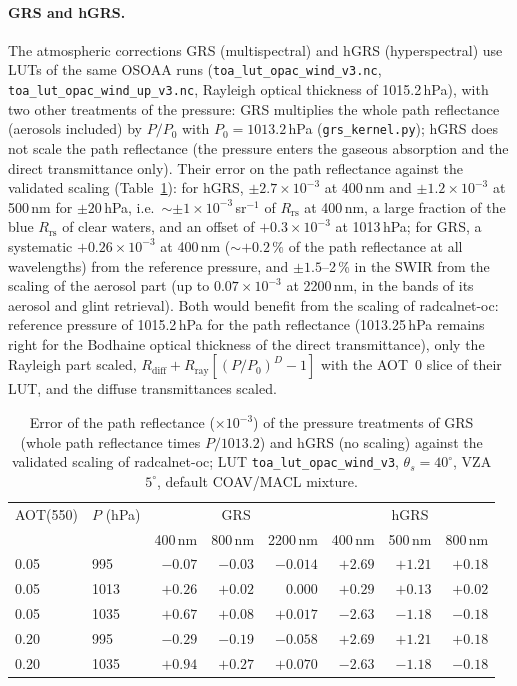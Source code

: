 \documentclass[11pt,a4paper]{article}
\newcommand{\Rrs}{R_\mathrm{rs}}
\newcommand{\code}[1]{\texttt{#1}}
\begin{document}
\paragraph{GRS and hGRS.} The atmospheric corrections GRS (multispectral) and hGRS (hyperspectral) use LUTs of the
same OSOAA runs (\code{toa\_lut\_opac\_wind\_v3.nc}, \code{toa\_lut\_opac\_wind\_up\_v3.nc}, Rayleigh optical thickness
of 1015.2\,hPa), with two other treatments of the pressure: GRS multiplies the whole path reflectance (aerosols
included) by $P/P_0$ with $P_0 = 1013.2$\,hPa (\code{grs\_kernel.py}); hGRS does not scale the path reflectance
(the pressure enters the gaseous absorption and the direct transmittance only). Their error on the path reflectance
against the validated scaling (Table~\ref{tab:grs_pressure}): for hGRS, $\pm2.7\times10^{-3}$ at 400\,nm and
$\pm1.2\times10^{-3}$ at 500\,nm for $\pm20$\,hPa, i.e.\ $\sim\pm1\times10^{-3}$\,sr$^{-1}$ of $\Rrs$ at 400\,nm, a large
fraction of the blue $\Rrs$ of clear waters, and an offset of $+0.3\times10^{-3}$ at 1013\,hPa; for GRS, a systematic
$+0.26\times10^{-3}$ at 400\,nm ($\sim+0.2\,\%$ of the path reflectance at all wavelengths) from the reference pressure,
and $\pm1.5$--2\,\% in the SWIR from the scaling of the aerosol part (up to $0.07\times10^{-3}$ at 2200\,nm, in the bands of
its aerosol and glint retrieval). Both would benefit from the scaling of radcalnet-oc: reference pressure of
1015.2\,hPa for the path reflectance (1013.25\,hPa remains right for the Bodhaine optical thickness of the direct
transmittance), only the Rayleigh part scaled, $R_\mathrm{diff} + R_\mathrm{ray}[(P/P_0)^D - 1]$ with the AOT~0 slice
of their LUT, and the diffuse transmittances scaled.

\begin{table}[h]
\centering\small
\caption{Error of the path reflectance ($\times10^{-3}$) of the pressure treatments of GRS (whole path reflectance
times $P/1013.2$) and hGRS (no scaling) against the validated scaling of radcalnet-oc; LUT \code{toa\_lut\_opac\_wind\_v3},
$\theta_s=40^\circ$, VZA $5^\circ$, default COAV/MACL mixture.}
\label{tab:grs_pressure}
\begin{tabular}{llrrrrrr}
\toprule
AOT(550) & $P$ (hPa) & \multicolumn{3}{c}{GRS} & \multicolumn{3}{c}{hGRS} \\
 & & 400\,nm & 800\,nm & 2200\,nm & 400\,nm & 500\,nm & 800\,nm \\
\midrule
0.05 & 995  & $-0.07$ & $-0.03$ & $-0.014$ & $+2.69$ & $+1.21$ & $+0.18$ \\
0.05 & 1013 & $+0.26$ & $+0.02$ & $0.000$  & $+0.29$ & $+0.13$ & $+0.02$ \\
0.05 & 1035 & $+0.67$ & $+0.08$ & $+0.017$ & $-2.63$ & $-1.18$ & $-0.18$ \\
0.20 & 995  & $-0.29$ & $-0.19$ & $-0.058$ & $+2.69$ & $+1.21$ & $+0.18$ \\
0.20 & 1035 & $+0.94$ & $+0.27$ & $+0.070$ & $-2.63$ & $-1.18$ & $-0.18$ \\
\bottomrule
\end{tabular}
\end{table}
\end{document}
